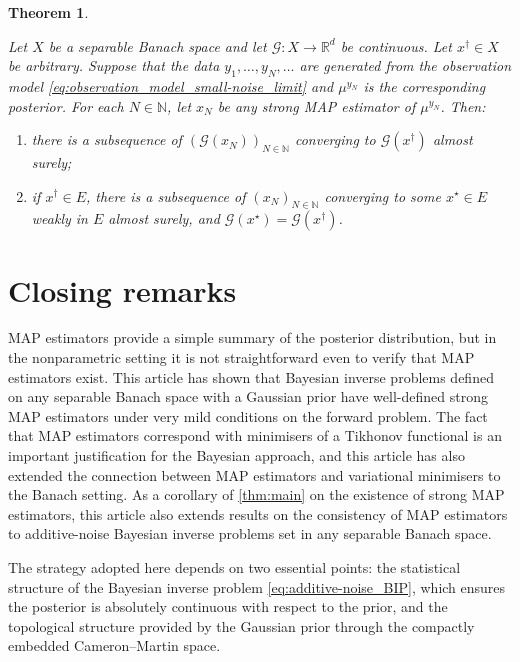 \documentclass[11pt]{article}
\newcommand*{\Naturals}{\mathbb{N}}
\newcommand*{\Reals}{\mathbb{R}}
\theoremstyle{plain}
\newtheorem{theorem}{Theorem}[section]
\theoremstyle{definition}
\numberwithin{equation}{section}
\numberwithin{figure}{section}
\numberwithin{table}{section}
\begin{document}
\begin{theorem}
	\label{thm:consistency_small-noise_limit}

	Let $X$ be a separable Banach space and let $\mathcal{G} \colon X \to \Reals^{d}$ be continuous. 
	Let $x^{\dagger} \in X$ be arbitrary.
	Suppose that the data $y_{1}, \dots, y_{N}, \dots$ are generated from the observation model \eqref{eq:observation_model_small-noise_limit} and $\mu^{y_{N}}$ is the corresponding posterior. 
	For each $N \in \Naturals$, let $x_{N}$ be any strong MAP estimator of $\mu^{y_{N}}$.
	Then:
	\begin{enumerate}[label=(\alph*)]
		\item there is a subsequence of $(\mathcal{G}(x_{N}))_{N \in \Naturals}$ converging to $\mathcal{G}(x^{\dagger})$ almost surely;
		\item if $x^{\dagger} \in E$, there is a subsequence of $(x_{N})_{N \in \Naturals}$ converging to some $x^{\star} \in E$ weakly in $E$ almost surely, and $\mathcal{G}(x^{\star}) = \mathcal{G}(x^{\dagger})$.
	\end{enumerate}
\end{theorem}

\section{Closing remarks}
\label{sec:conclusion}

MAP estimators provide a simple summary of the posterior distribution, but in the nonparametric setting it is not straightforward even to verify that MAP estimators exist.
This article has shown that Bayesian inverse problems defined on any separable Banach space with a Gaussian prior have well-defined strong MAP estimators under very mild conditions on the forward problem.
The fact that MAP estimators correspond with minimisers of a Tikhonov functional is an important justification for the Bayesian approach, and this article has also extended the connection between MAP estimators and variational minimisers to the Banach setting.
As a corollary of \cref{thm:main} on the existence of strong MAP estimators, this article also extends results on the consistency of MAP estimators to additive-noise Bayesian inverse problems set in any separable Banach space.

The strategy adopted here depends on two essential points:
the statistical structure of the Bayesian inverse problem \eqref{eq:additive-noise_BIP}, which ensures the posterior is absolutely continuous with respect to the prior, and the topological structure provided by the Gaussian prior through the compactly embedded Cameron--Martin space.
\end{document}
